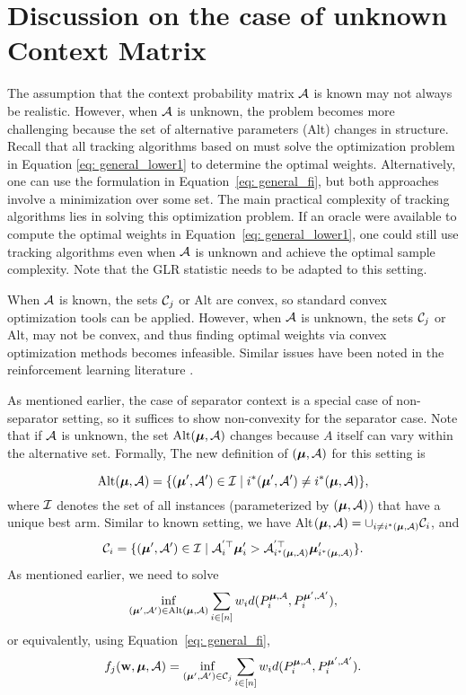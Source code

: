 \section{Discussion on the case of unknown Context Matrix} \label{apd: unknown context}


    The assumption that the context probability matrix $\mathcal{A}$ is known may not always be realistic. However, when $\mathcal{A}$ is unknown, the problem becomes more challenging because the set of alternative parameters (Alt) changes in structure. Recall that all tracking algorithms based on \cite{track-stop-garivier2016optimal} must solve the optimization problem in Equation \eqref{eq: general_lower1} to determine the optimal weights. Alternatively, one can use the formulation in Equation~\eqref{eq: general_fi}, but both approaches involve a minimization over some set. The main practical complexity of tracking algorithms lies in solving this optimization problem.
    If an oracle were available to compute the optimal weights in Equation~\eqref{eq: general_lower1}, one could still use tracking algorithms even when \(\mathcal{A}\) is unknown and achieve the optimal sample complexity. Note that the GLR statistic needs to be adapted to this setting.

    
    When \(\mathcal{A}\) is known, the sets \(\mathcal{C}_j\) or \(\text{Alt}\) are convex, so standard convex optimization tools can be applied. However, when $\mathcal{A}$ is unknown, the sets $\mathcal{C}_j$ or Alt, may not be convex, and thus finding optimal weights via convex optimization methods becomes infeasible. Similar issues have been noted in the reinforcement learning literature \cite{al2021adaptive}.    
    
    As mentioned earlier, the case of separator context is a special case of non-separator setting, so it suffices to show non-convexity for the separator case.  Note that if $\mathcal{A}$ is unknown, the set $\text{Alt}(\boldsymbol{\mu}, \mathcal{A})$ changes because $A$ itself can vary within the alternative set. Formally, The new definition of $(\boldsymbol{\mu}, \mathcal{A})$ for this setting is
    
    $$
        \text{Alt}(\boldsymbol{\mu}, \mathcal{A})  = \{(\boldsymbol{\mu}', \mathcal{A}') \in \mathcal{I} \mid  i^*(\boldsymbol{\mu}', \mathcal{A}') \neq i^*(\boldsymbol{\mu}, \mathcal{A})  \},
    $$
    where $\mathcal{I}$ denotes the set of all instances (parameterized by $(\boldsymbol{\mu}, \mathcal{A})$) that have a unique best arm. Similar to known setting, we have Alt$(\boldsymbol{\mu}, \mathcal{A}) = \cup_{i \neq i^*(\boldsymbol{\mu}, \mathcal{A})} \mathcal{C}_i$, and
    $$
    \mathcal{C}_i = \{ (\boldsymbol{\mu}', \mathcal{A}') \in \mathcal{I} \mid \mathcal{A}_i^{'\top} \boldsymbol{\mu}'_i > \mathcal{A}_{i^*(\boldsymbol{\mu}, \mathcal{A})}^{'\top} \boldsymbol{\mu}'_{i^*(\boldsymbol{\mu}, \mathcal{A})} \}.
    $$
    As mentioned earlier, we need to solve
    $$
        \inf_{(\boldsymbol{\mu}', \mathcal{A}') \in \text{Alt}(\boldsymbol{\mu}, \mathcal{A})} \sum_{i \in [n]} w_i d(P^{\boldsymbol{\mu}, \mathcal{A}}_{i}, P^{\boldsymbol{\mu}', \mathcal{A}'}_{i}),
    $$
    or equivalently, using Equation~\eqref{eq: general_fi},
    \begin{align}
        f_j(\mathbf{w}, \boldsymbol{\mu}, \mathcal{A}) = \inf_{(\boldsymbol{\mu}', \mathcal{A}') \in \mathcal{C}_j} \sum_{i \in [n]} w_i d(P^{\boldsymbol{\mu}, \mathcal{A}}_{i}, P^{\boldsymbol{\mu}', \mathcal{A}'}_{i}).
    \end{align}
    
